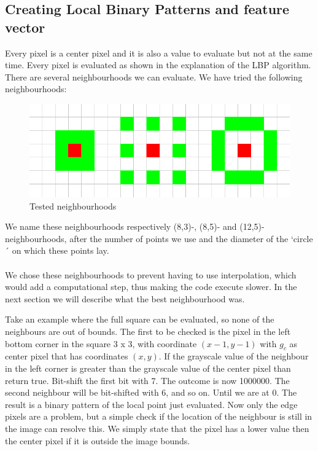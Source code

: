 \documentclass[a4paper]{article}
\begin{document}
\subsection{Creating Local Binary Patterns and feature vector}
Every pixel is a center pixel and it is also a value to evaluate but not at the
same time. Every pixel is evaluated as shown in the explanation
of the LBP algorithm. There are several neighbourhoods we can evaluate. We have
tried the following neighbourhoods:

\begin{figure}[H]
\center
\includegraphics[scale=0.5]{neighbourhoods.png}
\caption{Tested neighbourhoods}
\end{figure}

We name these neighbourhoods respectively (8,3)-, (8,5)- and
(12,5)-neighbourhoods, after the number of points we use and the diameter
of the `circle´ on which these points lay.\\
\\
We chose these neighbourhoods to prevent having to use interpolation, which
would add a computational step, thus making the code execute slower. In the
next section we will describe what the best neighbourhood was.

Take an example where the full square can be evaluated, so none of the
neighbours are out of bounds. The first to be checked is the pixel in the left
bottom corner in the square 3 x 3, with coordinate $(x - 1, y - 1)$ with $g_c$
as center pixel that has coordinates $(x, y)$. If the grayscale value of the
neighbour in the left corner is greater than the grayscale
value of the center pixel than return true. Bit-shift the first bit with 7. The
outcome is now 1000000. The second neighbour will be bit-shifted with 6, and so
on. Until we are at 0. The result is a binary pattern of the local point just
evaluated.
Now only the edge pixels are a problem, but a simple check if the location of
the neighbour is still in the image can resolve this. We simply state that the
pixel has a lower value then the center pixel if it is outside the image
bounds.
\end{document}
